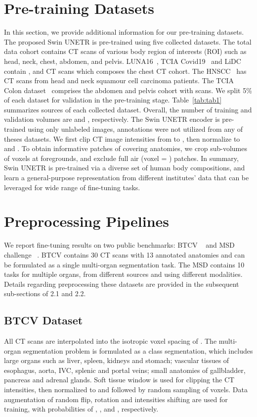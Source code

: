 \documentclass[10pt,twocolumn,letterpaper]{article}
\begin{document}
\section{Pre-training Datasets}
\label{sec:pre_data}
In this section, we provide additional information for our pre-training datasets. The proposed Swin UNETR is pre-trained using five collected datasets. The total data cohort contains  CT scans of various body region of interests (ROI) such as head, neck, chest, abdomen, and pelvis. LUNA16~\cite{setio2017validation}, TCIA Covid19~\cite{desai2020chest} and LiDC~\cite{armato2011lung} contain ,  and  CT scans which composes the chest CT cohort. The HNSCC~\cite{grossberg2018imaging} has  CT scans from head and neck squamour cell carcinoma patients. The TCIA Colon dataset~\cite{johnson2008accuracy} comprises the abdomen and pelvis cohort with  scans. We split 5\% of each dataset for validation in the pre-training stage. Table~\ref{tab:tab1} summarizes sources of each collected dataset. Overall, the number of training and validation volumes are  and , respectively. The Swin UNETR encoder is pre-trained using only unlabeled images, annotations were not utilized from any of theses datasets. We first clip CT image intensities from  to , then normalize to  and . To obtain informative patches of covering anatomies, we crop sub-volumes of  voxels at foregrounds, and exclude full air (voxel = ) patches. In summary, Swin UNETR is pre-trained via a diverse set of human body compositions, and learn a general-purpose representation from different institutes' data that can be leveraged for wide range of fine-tuning tasks.


\section{Preprocessing Pipelines}
\label{sec:preprocess}
We report fine-tuning results on two public benchmarks: BTCV ~\cite{landman2015miccai} and MSD challenge ~\cite{simpson2019large}. BTCV contains 30 CT scans with 13 annotated anatomies and can be formulated as a single multi-organ segmentation task. The MSD contains 10 tasks for multiple organs, from different sources and using different modalities. Details regarding preprocessing these datasets are provided in the subsequent sub-sections of 2.1 and 2.2.


\subsection{BTCV Dataset}
   All CT scans are interpolated into the isotropic voxel spacing of . The multi-organ segmentation problem is formulated as a  class segmentation, which includes large organs such as liver, spleen, kidneys and stomach; vascular tissues of esophagus, aorta, IVC, splenic and portal veins; small anatomies of gallbladder,  pancreas and adrenal glands. Soft tissue window is used for clipping the CT intensities, then normalized to  and  followed by random sampling of  voxels. Data augmentation of random flip, rotation and intensities shifting are used for training, with probabilities of , , and , respectively.
\end{document}
